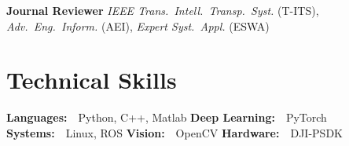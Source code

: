 \documentclass[11pt,a4paper]{article}
\begin{document}
\noindent\textbf{Journal Reviewer}\quad
\textit{IEEE Trans.\ Intell.\ Transp.\ Syst.} (T-ITS),
\textit{Adv.\ Eng.\ Inform.} (AEI),
\textit{Expert Syst.\ Appl.} (ESWA)

\section{Technical Skills}

\noindent
\textbf{Languages:}\ \ Python, C++, Matlab
\quad
\textbf{Deep Learning:}\ \ PyTorch
\quad
\textbf{Systems:}\ \ Linux, ROS
\quad
\textbf{Vision:}\ \ OpenCV
\quad
\textbf{Hardware:}\ \ DJI-PSDK
\end{document}
